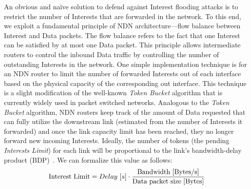 




An obvious and na\"ive solution to defend against Interest flooding attacks is to restrict the number of Interests that are forwarded in the network. To this end, we exploit a 
 fundamental principle of NDN architecture---flow balance between Interest and Data packets. The flow balance refers to the fact that one Interest can be satisfied by at most one Data packet. This principle allows intermediate routers to control the inbound Data traffic by controlling the number of outstanding Interests in the network. 
One simple implementation technique  is for an NDN router to limit the number of forwarded Interests out of each interface based on the physical capacity of the corresponding out interface. This technique is a slight modification of the well-known {\it Token Bucket} algorithm that is currently widely used in packet switched networks. Analogous to the {\it Token Bucket} algorithm, NDN routers keep track of the amount of Data requested that can fully utilize the downstream link (estimated from the number of Interests it forwarded) and once the link capacity limit has been reached, they no longer forward new incoming Interests. Ideally, the number of tokens (the pending \emph{Interests Limit}) for each link will be proportional to the link's bandwidth-delay product (BDP)~\cite{tcp-survey}. We can formalize this value as follows:
%
\begin{equation}
\small \mathrm{Interest\ Limit} = Delay\ [s] \cdot \frac{\mathrm{Bandwidth\ [Bytes/s]}}{\mathrm{Data\ packet\ size\ [Bytes]}}
\end{equation}

